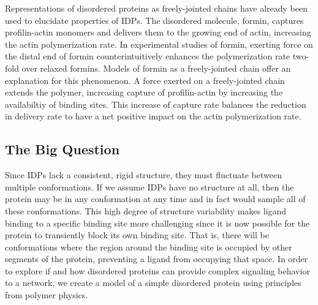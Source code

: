 \documentclass[../AdvancementSummary.tex]{subfiles}
\begin{document}
Representations of disordered proteins as freely-jointed chains have already been used to elucidate properties of IDPs. The disordered molecule, formin, captures profilin-actin monomers and delivers them to the growing end of actin, increasing the actin polymerization rate. In experimental studies of formin, exerting force on the distal end of formin counterintuitively enhances the polymerization rate two-fold over relaxed formins. \cite{Jegou2013} Models of formin as a freely-jointed chain offer an explanation for this phenomenon. A force exerted on a freely-jointed chain extends the polymer, increasing capture of profilin-actin by increasing the availabiltiy of binding sites. This increase of capture rate balances the reduction in delivery rate to have a net positive impact on the actin polymerization rate. \cite{Bryant2017}


\subsection{The Big Question}

Since IDPs lack a consistent, rigid structure, they must fluctuate between multiple conformations.  If we assume IDPs have no structure at all, then the protein may be in any conformation at any time and in fact would sample all of these conformations.  This high degree of structure variability makes ligand binding to a specific binding site more challenging since it is now possible for the protein to transiently block its own binding site. That is, there will be conformations where the region around the binding site is occupied by other segments of the protein, preventing a ligand from occupying that space. In order to explore if and how disordered proteins can provide complex signaling behavior to a network, we create a model of a simple disordered protein using principles from polymer physics.

\end{document}
